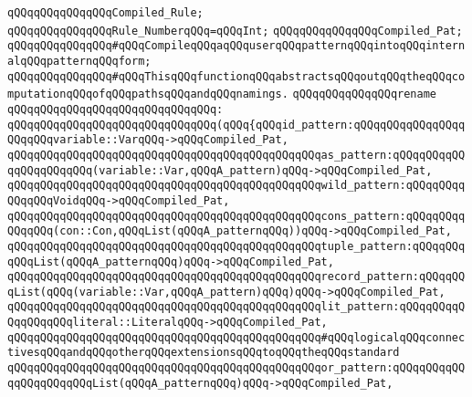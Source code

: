 \verb|qQQqqQQqqQQqqQQqCompiled_Rule;|\newline
\verb|qQQqqQQqqQQqqQQqRule_NumberqQQq=qQQqInt;|\newline
\verb|qQQqqQQqqQQqqQQqCompiled_Pat;|\newline
\newline
\newline
\newline
\verb|qQQqqQQqqQQqqQQq#qQQqCompileqQQqaqQQquserqQQqpatternqQQqintoqQQqinternalqQQqpatternqQQqform;|\newline
\verb|qQQqqQQqqQQqqQQq#qQQqThisqQQqfunctionqQQqabstractsqQQqoutqQQqtheqQQqcomputationqQQqofqQQqpathsqQQqandqQQqnamings.|\newline
\newline
\verb|qQQqqQQqqQQqqQQqrename|\newline
\verb|qQQqqQQqqQQqqQQqqQQqqQQqqQQqqQQq:|\newline
\verb|qQQqqQQqqQQqqQQqqQQqqQQqqQQqqQQq(qQQq{qQQqid_pattern:qQQqqQQqqQQqqQQqqQQqqQQqvariable::VarqQQq->qQQqCompiled_Pat,|\newline
\verb|qQQqqQQqqQQqqQQqqQQqqQQqqQQqqQQqqQQqqQQqqQQqqQQqas_pattern:qQQqqQQqqQQqqQQqqQQqqQQq(variable::Var,qQQqA_pattern)qQQq->qQQqCompiled_Pat,|\newline
\verb|qQQqqQQqqQQqqQQqqQQqqQQqqQQqqQQqqQQqqQQqqQQqqQQqwild_pattern:qQQqqQQqqQQqqQQqVoidqQQq->qQQqCompiled_Pat,|\newline
\verb|qQQqqQQqqQQqqQQqqQQqqQQqqQQqqQQqqQQqqQQqqQQqqQQqcons_pattern:qQQqqQQqqQQqqQQq(con::Con,qQQqList(qQQqA_patternqQQq))qQQq->qQQqCompiled_Pat,|\newline
\verb|qQQqqQQqqQQqqQQqqQQqqQQqqQQqqQQqqQQqqQQqqQQqqQQqtuple_pattern:qQQqqQQqqQQqList(qQQqA_patternqQQq)qQQq->qQQqCompiled_Pat,|\newline
\verb|qQQqqQQqqQQqqQQqqQQqqQQqqQQqqQQqqQQqqQQqqQQqqQQqrecord_pattern:qQQqqQQqList(qQQq(variable::Var,qQQqA_pattern)qQQq)qQQq->qQQqCompiled_Pat,|\newline
\verb|qQQqqQQqqQQqqQQqqQQqqQQqqQQqqQQqqQQqqQQqqQQqqQQqlit_pattern:qQQqqQQqqQQqqQQqqQQqliteral::LiteralqQQq->qQQqCompiled_Pat,|\newline
\newline
\verb|qQQqqQQqqQQqqQQqqQQqqQQqqQQqqQQqqQQqqQQqqQQqqQQq#qQQqlogicalqQQqconnectivesqQQqandqQQqotherqQQqextensionsqQQqtoqQQqtheqQQqstandard|\newline
\verb|qQQqqQQqqQQqqQQqqQQqqQQqqQQqqQQqqQQqqQQqqQQqqQQqor_pattern:qQQqqQQqqQQqqQQqqQQqqQQqList(qQQqA_patternqQQq)qQQq->qQQqCompiled_Pat,|\newline
